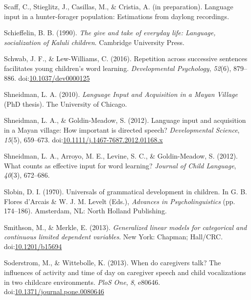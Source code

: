 \documentclass[,man,floatsintext]{apa6}
\begin{document}
\hypertarget{ref-scaffIPlanguage}{}
Scaff, C., Stieglitz, J., Casillas, M., \& Cristia, A. (in preparation).
Language input in a hunter-forager population: Estimations from daylong
recordings.

\hypertarget{ref-schieffelin1990give}{}
Schieffelin, B. B. (1990). \emph{The give and take of everyday life:
Language, socialization of Kaluli children}. Cambridge University Press.

\hypertarget{ref-schwab2016repetition}{}
Schwab, J. F., \& Lew-Williams, C. (2016). Repetition across successive
sentences facilitates young children's word learning.
\emph{Developmental Psychology}, \emph{52}(6), 879--886.
doi:\href{https://doi.org/10.1037/dev0000125}{10.1037/dev0000125}

\hypertarget{ref-shneidman2010language}{}
Shneidman, L. A. (2010). \emph{Language Input and Acquisition in a Mayan
Village} (PhD thesis). The University of Chicago.

\hypertarget{ref-shneidman2012language}{}
Shneidman, L. A., \& Goldin-Meadow, S. (2012). Language input and
acquisition in a Mayan village: How important is directed speech?
\emph{Developmental Science}, \emph{15}(5), 659--673.
doi:\href{https://doi.org/10.1111/j.1467-7687.2012.01168.x}{10.1111/j.1467-7687.2012.01168.x}

\hypertarget{ref-shneidman2012counts}{}
Shneidman, L. A., Arroyo, M. E., Levine, S. C., \& Goldin-Meadow, S.
(2012). What counts as effective input for word learning? \emph{Journal
of Child Language}, \emph{40}(3), 672--686.

\hypertarget{ref-slobin1970universals}{}
Slobin, D. I. (1970). Universals of grammatical development in children.
In G. B. Flores d'Arcais \& W. J. M. Levelt (Eds.), \emph{Advances in
Psycholinguistics} (pp. 174--186). Amsterdam, NL: North Holland
Publishing.

\hypertarget{ref-smithson2013generalized}{}
Smithson, M., \& Merkle, E. (2013). \emph{Generalized linear models for
categorical and continuous limited dependent variables}. New York:
Chapman; Hall/CRC.
doi:\href{https://doi.org/10.1201/b15694}{10.1201/b15694}

\hypertarget{ref-soderstrom2013when}{}
Soderstrom, M., \& Wittebolle, K. (2013). When do caregivers talk? The
influences of activity and time of day on caregiver speech and child
vocalizations in two childcare environments. \emph{PloS One}, \emph{8},
e80646.
doi:\href{https://doi.org/10.1371/journal.pone.0080646}{10.1371/journal.pone.0080646}
\end{document}
